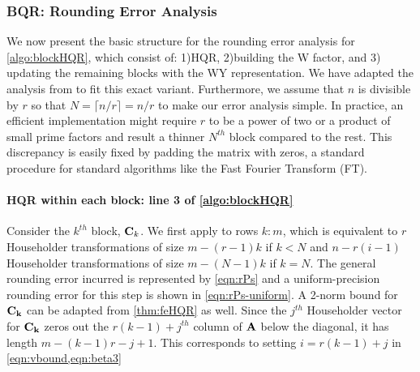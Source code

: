 \subsubsection{BQR: Rounding Error Analysis}
We now present the basic structure for the rounding error analysis for \cref{algo:blockHQR}, which consist of: 1)HQR, 2)building the W factor, and 3) updating the remaining blocks with the WY representation.
We have adapted the analysis from \cite{Higham2002} to fit this exact variant.
Furthermore, we assume that $n$ is divisible by $r$ so that $N= \lceil n/r\rceil =n/r$ to make our error analysis simple.
In practice, an efficient implementation might require $r$ to be a power of two or a product of small prime factors and result a thinner $N^{th}$ block compared to the rest. 
This discrepancy is easily fixed by padding the matrix with zeros, a standard procedure for standard algorithms like the Fast Fourier Transform (FT).
\paragraph{HQR within each block: line 3 of \cref{algo:blockHQR}}
Consider the $k^{th}$ block, $\mathbf{C}_k$. 
We first apply  to rows $k:m$, which is equivalent to $r$ Householder transformations of size $m-(r-1)k$ if $k < N$ and $n-r(i-1)$ Householder transformations of size $m-(N-1)k$ if $k=N$. 
The general rounding error incurred is represented by \cref{eqn:rPs} and a uniform-precision rounding error for this step is shown in \cref{eqn:rPs-uniform}.
A 2-norm bound for $\mathbf{C_k}$ can be adapted from \cref{thm:feHQR} as well.
Since the $j^{th}$ Householder vector for $\mathbf{C_k}$ zeros out the $r(k-1)+j^{th}$ column of $\mathbf{A}$ below the diagonal, it has length  $m -(k-1)r-j+1$. 
This corresponds to setting $i=r(k-1)+j$ in \cref{eqn:vbound,eqn:beta3}
